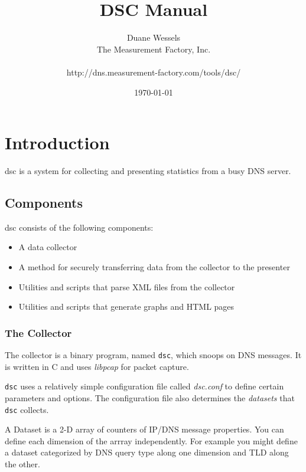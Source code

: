 \documentclass{report}
\def\dsc{{\sc dsc}}
\begin{document}
\begin{titlepage}
\title{DSC Manual}
\author{Duane Wessels\\
The Measurement Factory, Inc.\\
\\
http://dns.measurement-factory.com/tools/dsc/}
\date{\today}
\end{titlepage}

\maketitle
\tableofcontents

\chapter{Introduction}

{\dsc} is a system for collecting and presenting statistics from
a busy DNS server.  

\section{Components}

{\dsc} consists of the following components:
\begin{itemize}
\item A data collector
\item A method for securely transferring data from the collector
	to the presenter
\item Utilities and scripts that parse XML files from the collector
\item Utilities and scripts that generate graphs and HTML pages
\end{itemize}

\subsection{The Collector}

The collector is a binary program, named {\tt dsc\/}, which snoops
on DNS messages.  It is written in C and uses {\em libpcap\/} for
packet capture.

{\tt dsc\/} uses a relatively simple configuration file called {\em
dsc.conf\/} to define certain parameters and options.  The configuration
file also determines the {\em datasets\/} that {\tt dsc\/} collects.

A Dataset is a 2-D array of counters of IP/DNS message properties.
You can define each dimension of the arrray independently.  For
example you might define a dataset categorized by DNS query type
along one dimension and TLD along the other.
\end{document}
